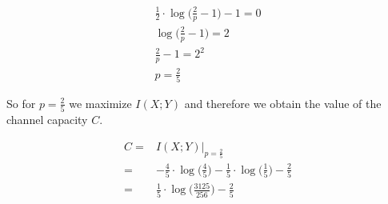 \begin{gather*}
	\frac{1}{2} \cdot \log \Big ( \frac{2}{p} - 1\Big)-1 = 0 \\
	\log \Big ( \frac{2}{p} - 1\Big) = 2 \\
	\frac{2}{p} - 1 = 2^2 \\
	p = \frac{2}{5}
\end{gather*}

So for $p=\frac{2}{5}$ we maximize $I(X;Y)$ and therefore we obtain the value of the channel capacity $C$.

\begin{align*}
	C = & I(X;Y)|_{p=\frac{2}{5}} \\ = &-\frac{4}{5} \cdot \log\Big (\frac{4}{5}\Big)- \frac{1}{5}\cdot\log \Big(\frac{1}{5}\Big)-\frac{2}{5} \\
	= & \frac{1}{5} \cdot \log \Big (\frac{3125}{256} \Big)-\frac{2}{5}
\end{align*}
